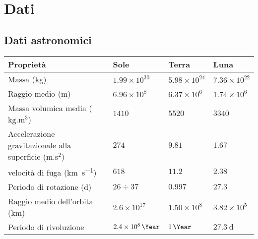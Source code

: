 \chapter{Dati}
\section{Dati astronomici}
\begin{small}
\begin{tabular}{p{}lll}
\hline
Proprietà & Sole & Terra & Luna\\
\hline Massa (\si{\kilogram}) & $1.99\times 10^{30}$ &
$5.98\times 10^{24}$&$7.36\times
10^{22}$\\
Raggio medio (\si{\meter})&$6.96\times 10^8$&$6.37\times
10^6$&$1.74\times
10^6$\\
Massa volumica media ($\si{\kilogram.\meter^3}$)&$1410$&$5520$&$3340$\\
Accelerazione gravitazionale alla superficie ($\si{\meter.\second\squared}$)&$274$&$9.81$&$1.67$\\
velocità di fuga (\si{\kilo\meter\per\second})&$618$&$11.2$&$2.38$\\
Periodo di rotazione (\si{\day})&$26\div37$&$0.997$&$27.3$\\
Raggio medio dell'orbita (\si{\kilo\meter})&$2.6\times
10^{17}$&$1.50\times 10^8$&$3.82\times 10^5$\\
Periodo di rivoluzione&$\SI{2.4E8}{\Year}$&
$\SI{1}{\Year}$&$\SI{27.3}{\day}$\\
\hline
\end{tabular}
\end{small}
